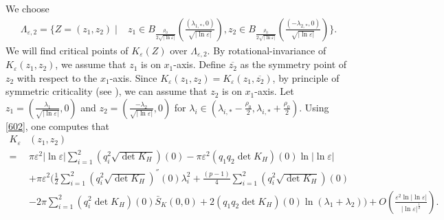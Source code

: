 \documentclass[12pt,reqno]{amsart}
\numberwithin{equation}{section}
\theoremstyle{definition}
\theoremstyle{remark}
\begin{document}
We choose 
\begin{equation*} 
\begin{split}
\Lambda_{\varepsilon, 2}=\bigg\{Z=(  z_1,  z_2) \mid &z_1\in B_{\frac{\rho_0}{2\sqrt{|\ln\varepsilon|}}}\left (\frac{(\lambda_{1,*},0)}{\sqrt{|\ln\varepsilon|}}\right ), z_2\in B_{\frac{\rho_0}{2\sqrt{|\ln\varepsilon|}}}\left (\frac{(-\lambda_{2,*},0)}{\sqrt{|\ln\varepsilon|}}\right )\bigg\}.
\end{split}
\end{equation*}
We will find critical points of $ K_\varepsilon(Z) $ over $ \Lambda_{\varepsilon, 2} $. By rotational-invariance of $ K_\varepsilon(z_1,z_2) $, we assume that $ z_1 $ is on $ x_1 $-axis. Define $ \overline{z_2} $ as the symmetry point of $ z_2 $ with respect to the $ x_1 $-axis. Since $ K_\varepsilon(z_1,z_2)=K_\varepsilon(z_1,\overline{z_2}) $, by  principle of symmetric criticality (see \cite{W}), we  can assume that $ z_2 $ is on $ x_1 $-axis. %
Let $ z_1=\left( \frac{\lambda_1}{\sqrt{|\ln\varepsilon|}},0\right)  $ and $ z_2=\left( \frac{-\lambda_2}{\sqrt{|\ln\varepsilon|}},0\right)  $ for $\lambda_i\in \left( \lambda_{i,*}-\frac{\rho_0}{2}, \lambda_{i,*}+\frac{\rho_0}{2}\right)   $. %
Using \eqref{602}, one computes that
\begin{equation} \label{703}
\begin{split}
K_\varepsilon&\left (z_1,z_2\right )\\
=&\pi\varepsilon^2|\ln\varepsilon|\sum_{i=1}^2\left( q_i^2\sqrt{\det K_H}\right) (0) -\pi\varepsilon^2\left( q_1q_2 \det K_H \right)(0)\ln|\ln\varepsilon|\\
&+\pi\varepsilon^2\bigg(  \frac{1}{2}\sum_{i=1}^2 \left(q_i^2\sqrt{\det K_H} \right)^{''}(0 )\lambda_i^2+ \frac{(p-1)}{4}   \sum_{i=1}^2\left( q_i^2\sqrt{\det K_H}\right) (0)     \\
&-2\pi  \sum_{i=1}^2 \left( q_i^2  \det K_H\right)(0) \bar{S}_K(0,0)+2\left( q_1q_2  \det K_H\right)(0)\ln (\lambda_1+\lambda_2)\bigg)  
+O\left( \frac{\varepsilon^2\ln|\ln\varepsilon|}{|\ln\varepsilon|^{\frac{1}{2}}}\right).
\end{split}
\end{equation}
\end{document}
